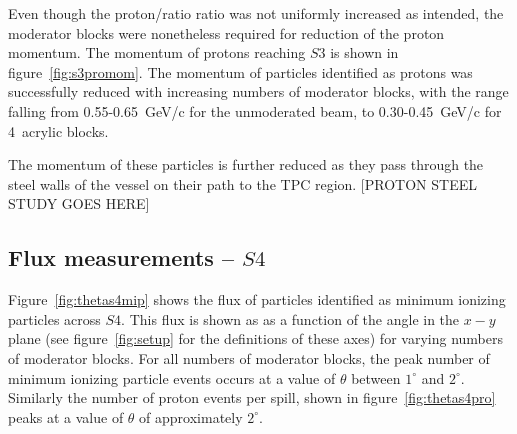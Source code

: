 Even though the proton/ratio ratio was not uniformly increased as intended, the moderator blocks were nonetheless required for reduction of the proton momentum.
The momentum of protons reaching $\mathit{S3}$ is shown in figure~\ref{fig:s3promom}. 
The momentum of particles identified as protons was successfully reduced with increasing numbers of moderator blocks, with the range falling from 0.55-0.65~GeV/c for the unmoderated beam, to 0.30-0.45~GeV/c for 4~acrylic blocks.

The momentum of these particles is further reduced as they pass through the steel walls of the vessel on their path to the TPC region.
[PROTON STEEL STUDY GOES HERE]


\subsection{Flux measurements -- $\mathit{S4}$}


Figure~\ref{fig:thetas4mip} shows the flux of particles identified as minimum ionizing particles across $\mathit{S4}$.
This flux is shown as as a function of the angle in the $x-y$ plane (see figure~\ref{fig:setup} for the definitions of these axes) for varying numbers of moderator blocks.
For all numbers of moderator blocks, the peak number of minimum ionizing particle events occurs at a value of $\theta$ between $1^{\circ}$ and $2^{\circ}$.
Similarly the number of proton events per spill, shown in figure~\ref{fig:thetas4pro} peaks at a value of $\theta$ of approximately $2^{\circ}$.

